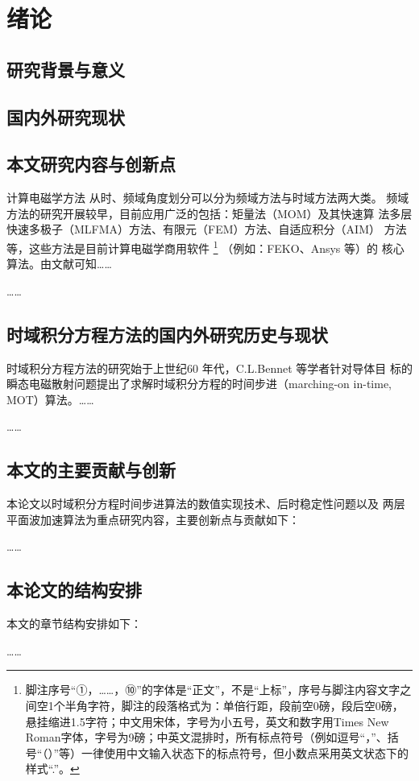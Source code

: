 
\chapter{绪论}

\section{研究背景与意义}

\section{国内外研究现状}

\section{本文研究内容与创新点}




计算电磁学方法
从时、频域角度划分可以分为频域方法与时域方法两大类。
频域方法的研究开展较早，目前应用广泛的包括：矩量法（MOM）及其快速算
法多层快速多极子（MLFMA）方法、有限元（FEM）方法、自适应积分（AIM）
方法等，这些方法是目前计算电磁学商用软件
\footnote{脚注序号“①，……，⑩”的字体是“正文”，不是“上标”，序号与脚注内容文字之间空1个半角字符，脚注的段落格式为：单倍行距，段前空0磅，段后空0磅，悬挂缩进1.5字符；中文用宋体，字号为小五号，英文和数字用Times New Roman字体，字号为9磅；中英文混排时，所有标点符号（例如逗号“，”、括号“（）”等）一律使用中文输入状态下的标点符号，但小数点采用英文状态下的样式“.”。}
（例如：FEKO、Ansys 等）的
核心算法。由文献\cite{feng997he,clerc2010discrete,xiao2012yi}可知……

……
\section{时域积分方程方法的国内外研究历史与现状}
时域积分方程方法的研究始于上世纪60 年代，C.L.Bennet 等学者针对导体目
标的瞬态电磁散射问题提出了求解时域积分方程的时间步进（marching-on in-time,
MOT）算法。……

……
\section{本文的主要贡献与创新}
本论文以时域积分方程时间步进算法的数值实现技术、后时稳定性问题以及
两层平面波加速算法为重点研究内容，主要创新点与贡献如下：

……
\section{本论文的结构安排}
本文的章节结构安排如下：

……

